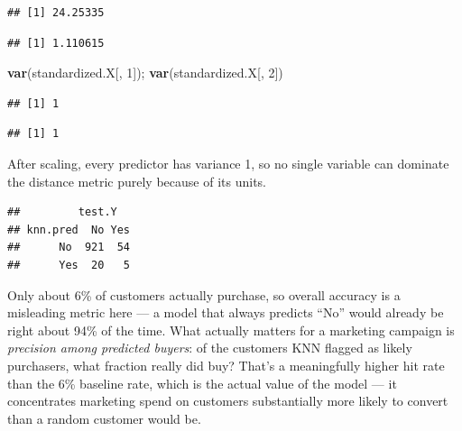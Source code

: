 \documentclass[
  11pt,
]{article}
\newenvironment{Shaded}{\begin{snugshade}}{\end{snugshade}}
\newcommand{\AttributeTok}[1]{\textcolor[rgb]{0.13,0.29,0.53}{#1}}
\newcommand{\DecValTok}[1]{\textcolor[rgb]{0.00,0.00,0.81}{#1}}
\newcommand{\FunctionTok}[1]{\textcolor[rgb]{0.13,0.29,0.53}{\textbf{#1}}}
\newcommand{\NormalTok}[1]{#1}
\newcommand{\OtherTok}[1]{\textcolor[rgb]{0.56,0.35,0.01}{#1}}
\newcommand{\SpecialCharTok}[1]{\textcolor[rgb]{0.81,0.36,0.00}{\textbf{#1}}}
\begin{document}
\begin{verbatim}
## [1] 24.25335
\end{verbatim}

\begin{verbatim}
## [1] 1.110615
\end{verbatim}

\begin{Shaded}
\begin{Highlighting}[]
\FunctionTok{var}\NormalTok{(standardized.X[, }\DecValTok{1}\NormalTok{]); }\FunctionTok{var}\NormalTok{(standardized.X[, }\DecValTok{2}\NormalTok{])}
\end{Highlighting}
\end{Shaded}

\begin{verbatim}
## [1] 1
\end{verbatim}

\begin{verbatim}
## [1] 1
\end{verbatim}

After scaling, every predictor has variance 1, so no single variable can
dominate the distance metric purely because of its units.

\begin{Shaded}
\end{Shaded}

\begin{verbatim}
##         test.Y
## knn.pred  No Yes
##      No  921  54
##      Yes  20   5
\end{verbatim}

Only about 6\% of customers actually purchase, so overall accuracy is a
misleading metric here --- a model that always predicts ``No'' would
already be right about 94\% of the time. What actually matters for a
marketing campaign is \emph{precision among predicted buyers}: of the
customers KNN flagged as likely purchasers, what fraction really did
buy? That's a meaningfully higher hit rate than the 6\% baseline rate,
which is the actual value of the model --- it concentrates marketing
spend on customers substantially more likely to convert than a random
customer would be.
\end{document}

